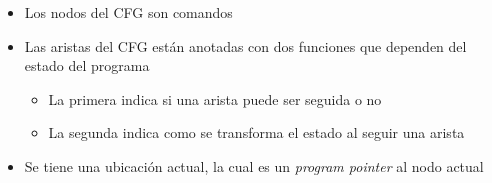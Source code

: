 \begin{frame}[fragile]
\begin{itemize}
\item<2->{Los nodos del CFG son comandos}
\item<3->{Las aristas del CFG están anotadas con dos funciones que dependen del estado del programa}
  \begin{itemize}
  \item<4->{La primera indica si una arista puede ser seguida o no}
  \item<5->{La segunda indica como se transforma el estado al seguir una arista}
  \end{itemize}
 \item<6->{Se tiene una ubicación actual, la cual es un \textit{program pointer} al nodo actual}
\end{itemize}


\end{frame}


